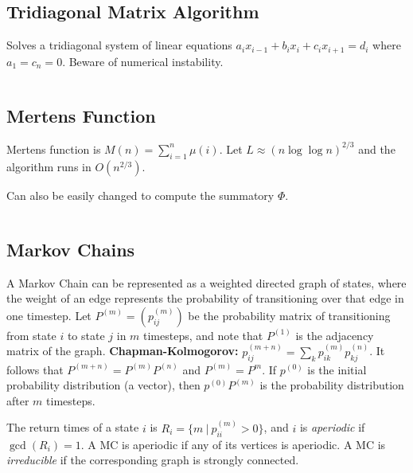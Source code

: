 \documentclass[9pt,a4paper,twocolumn,landscape,oneside]{amsart}
\newcommand{\code}[1]{\inputminted{cpp}{_code/#1}}
\newif\ifverbose
\begin{document}
    \subsection{Tridiagonal Matrix Algorithm}
        Solves a tridiagonal system of linear equations $a_ix_{i-1} + b_ix_i +
        c_ix_{i+1} = d_i$ where $a_1 = c_n = 0$. Beware of numerical
        instability.
        \code{mathematics/tridiagonal.cpp}

    \subsection{Mertens Function}
        Mertens function is $M(n) = \sum_{i=1}^n \mu(i)$. Let $L\approx
        (n\log{\log{n}})^{2/3}$ and the algorithm runs in $O(n^{2/3})$.
        \ifverbose
        \else
            Can also be easily changed to compute the summatory $\Phi$.
        \fi
        \code{mathematics/mertens.cpp}
    \ifverbose
    \subsection{Summatory Phi}
        The summatory phi function $\Phi(n) = \sum_{i=1}^n \phi(i)$. Let $L\approx
        (n\log{\log{n}})^{2/3}$ and the algorithm runs in $O(n^{2/3})$.
        \code{mathematics/summatory_phi.cpp}
    \fi

    \subsection{Markov Chains}
        A Markov Chain can be represented as a weighted directed graph of
        states, where the weight of an edge represents the probability of
        transitioning over that edge in one timestep. Let $P^{(m)} = (p^{(m)}_{ij})$
        be the probability matrix of transitioning from state $i$ to state $j$
        in $m$ timesteps, and note that $P^{(1)}$ is the adjacency matrix of
        the graph. \textbf{Chapman-Kolmogorov:} $p^{(m+n)}_{ij} = \sum_{k}
        p^{(m)}_{ik} p^{(n)}_{kj}$. It follows that $P^{(m+n)} =
        P^{(m)}P^{(n)}$ and $P^{(m)} = P^m$. If $p^{(0)}$ is the initial
        probability distribution (a vector), then $p^{(0)}P^{(m)}$ is the
        probability distribution after $m$ timesteps. 

        The return times of a state $i$ is $R_i = \{m\ |\ p^{(m)}_{ii} > 0 \}$,
        and $i$ is \textit{aperiodic} if $\gcd(R_i) = 1$. A MC is aperiodic if
        any of its vertices is aperiodic. A MC is \textit{irreducible} if the
        corresponding graph is strongly connected.
\end{document}

